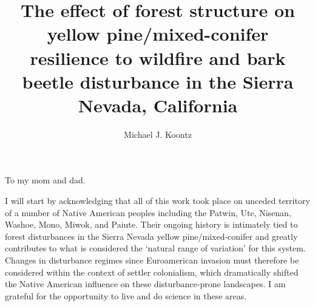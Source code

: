 \documentclass[twoside,12pt,final]{ucthesis-CA2012}
\begin{document}
\begin{ucfrontmatter}


  \title{The effect of forest structure on yellow pine/mixed-conifer resilience
to wildfire and bark beetle disturbance in the Sierra Nevada, California}
  \author{Michael J. Koontz}

   
  \othermemberC{} %
  
	\maketitle
	

    \begin{dedication}

      \vspace*{20ex}
      \begin{center}
      \begin{large}

        To my mom and dad.

      \end{large}
      \end{center}
  \end{dedication}
\begin{acknowledgements}
    I will start by acknowledging that all of this work took place on
    unceded territory of a number of Native American peoples including the
    Patwin, Ute, Nisenan, Washoe, Mono, Miwok, and Paiute. Their ongoing
    history is intimately tied to forest disturbances in the Sierra Nevada
    yellow pine/mixed-conifer and greatly contributes to what is considered
    the `natural range of variation' for this system. Changes in disturbance
    regimes since Euroamerican invasion must therefore be considered within
    the context of settler colonialism, which dramatically shifted the
    Native American influence on these disturbance-prone landscapes. I am
    grateful for the opportunity to live and do science in these areas.
    

\end{acknowledgements}
\end{ucfrontmatter}
\end{document}
